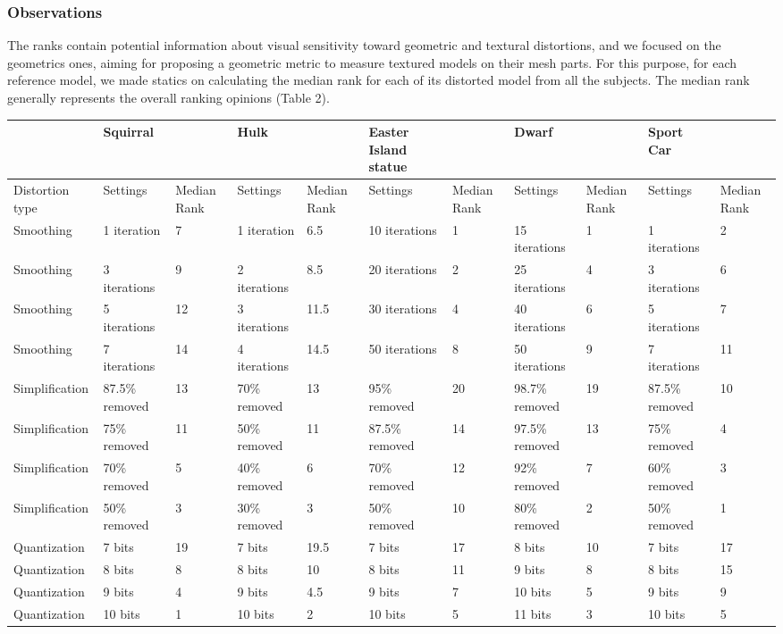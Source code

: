 \subsubsection{Observations}
The ranks contain potential information about visual sensitivity toward geometric and textural distortions, and we focused on the geometrics ones, aiming for proposing a geometric metric to measure textured models on their mesh parts.  For this purpose, for each reference model, we made statics on calculating the median rank for each of its distorted model from all the subjects. The median rank generally represents the overall ranking opinions (Table 2). \\
\begin{tabular}{ | l | l | l | l | l | l | l | l | l | l | l | }
\hline
	 & Squirral &  & Hulk &  & Easter Island statue &  & Dwarf &  & Sport Car &  \\ \hline
	Distortion type & Settings & Median Rank & Settings & Median Rank & Settings & Median Rank & Settings & Median Rank & Settings & Median Rank \\ \hline
	Smoothing & 1 iteration & 7 & 1 iteration & 6.5 & 10 iterations & 1 & 15 iterations & 1 & 1 iterations & 2 \\ \hline
	Smoothing & 3 iterations & 9 & 2 iterations & 8.5 & 20 iterations & 2 & 25 iterations & 4 & 3 iterations & 6 \\ \hline
	Smoothing & 5 iterations & 12 & 3 iterations & 11.5 & 30 iterations & 4 & 40 iterations & 6 & 5 iterations & 7 \\ \hline
	Smoothing & 7 iterations & 14 & 4 iterations & 14.5 & 50 iterations & 8 & 50 iterations & 9 & 7 iterations & 11 \\ \hline
	Simplification & 87.5\% removed & 13 & 70\% removed & 13 & 95\% removed & 20 & 98.7\% removed & 19 & 87.5\% removed & 10 \\ \hline
	Simplification & 75\% removed & 11 & 50\% removed & 11 & 87.5\% removed & 14 & 97.5\% removed & 13 & 75\% removed & 4 \\ \hline
	Simplification & 70\% removed & 5 & 40\% removed & 6 & 70\% removed & 12 & 92\% removed & 7 & 60\% removed & 3 \\ \hline
	Simplification & 50\% removed & 3 & 30\% removed & 3 & 50\% removed & 10 & 80\% removed & 2 & 50\% removed & 1 \\ \hline
	Quantization & 7 bits & 19 & 7 bits & 19.5 & 7 bits & 17 & 8 bits & 10 & 7 bits & 17 \\ \hline
	Quantization & 8 bits & 8 & 8 bits & 10 & 8 bits & 11 & 9 bits & 8 & 8 bits & 15 \\ \hline
	Quantization & 9 bits & 4 & 9 bits & 4.5 & 9 bits & 7 & 10 bits & 5 & 9 bits & 9 \\ \hline
	Quantization & 10 bits & 1 & 10 bits & 2 & 10 bits & 5 & 11 bits & 3 & 10 bits & 5 \\ \hline
\end{tabular}

